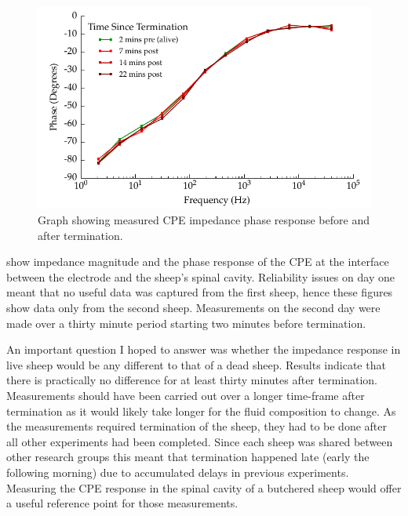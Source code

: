     \begin{figure}
      \centering
      \includegraphics{content/pt2/08-InterfaceParameters/graphics/graph_Day2_Sheep_CPE_ImpedancePhase}
      \caption{\label{fig:graph_Day2_Sheep_CPE_ImpedancePhase} Graph showing measured CPE impedance phase response before and after termination.}
    \end{figure}


     show impedance magnitude and the phase response of the CPE at the interface between the electrode and the sheep's spinal cavity.
    Reliability issues on day one meant that no useful data was captured from the first sheep, hence these figures show data only from the second sheep.
    Measurements on the second day were made over a thirty minute period starting two minutes before termination.

    An important question I hoped to answer was whether the impedance response in live sheep would be any different to that of a dead sheep.
    Results indicate that there is practically no difference for at least thirty minutes after termination.
    Measurements should have been carried out over a longer time-frame after termination as it would likely take longer for the fluid composition to change.
    As the measurements required termination of the sheep, they had to be done after all other experiments had been completed.
    Since each sheep was shared between other research groups this meant that termination happened late (early the following morning) due to accumulated delays in previous experiments.
    Measuring the CPE response in the spinal cavity of a butchered sheep would offer a useful reference point for those measurements.



